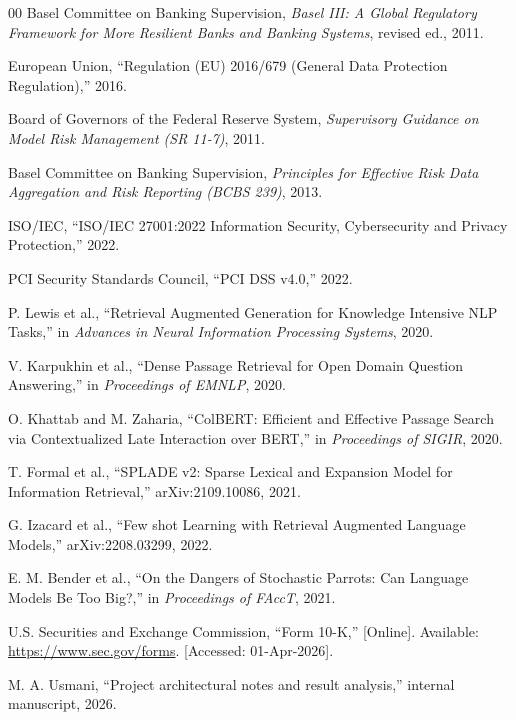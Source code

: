 \documentclass[conference]{IEEEtran}
\begin{document}
\clearpage
\begin{thebibliography}{00}
Basel Committee on Banking Supervision, \textit{Basel III: A Global Regulatory Framework for More Resilient Banks and Banking Systems}, revised ed., 2011.

European Union, ``Regulation (EU) 2016/679 (General Data Protection Regulation),'' 2016.

Board of Governors of the Federal Reserve System, \textit{Supervisory Guidance on Model Risk Management (SR 11-7)}, 2011.

Basel Committee on Banking Supervision, \textit{Principles for Effective Risk Data Aggregation and Risk Reporting (BCBS 239)}, 2013.

ISO/IEC, ``ISO/IEC 27001:2022 Information Security, Cybersecurity and Privacy Protection,'' 2022.

PCI Security Standards Council, ``PCI DSS v4.0,'' 2022.

P. Lewis et al., ``Retrieval Augmented Generation for Knowledge Intensive NLP Tasks,'' in \textit{Advances in Neural Information Processing Systems}, 2020.

V. Karpukhin et al., ``Dense Passage Retrieval for Open Domain Question Answering,'' in \textit{Proceedings of EMNLP}, 2020.

O. Khattab and M. Zaharia, ``ColBERT: Efficient and Effective Passage Search via Contextualized Late Interaction over BERT,'' in \textit{Proceedings of SIGIR}, 2020.

T. Formal et al., ``SPLADE v2: Sparse Lexical and Expansion Model for Information Retrieval,'' arXiv:2109.10086, 2021.

G. Izacard et al., ``Few shot Learning with Retrieval Augmented Language Models,'' arXiv:2208.03299, 2022.

E. M. Bender et al., ``On the Dangers of Stochastic Parrots: Can Language Models Be Too Big?,'' in \textit{Proceedings of FAccT}, 2021.

U.S. Securities and Exchange Commission, ``Form 10-K,'' [Online]. Available: \url{https://www.sec.gov/forms}. [Accessed: 01-Apr-2026].

M. A. Usmani, ``Project architectural notes and result analysis,'' internal manuscript, 2026.


\end{thebibliography}
\end{document}
